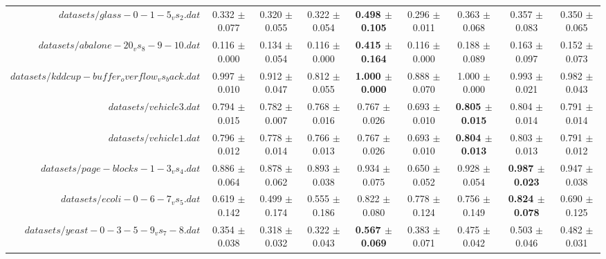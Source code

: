 \begin{table}[!ht]
{\begin{tabular}{r c c c c c c c c}
$datasets/glass-0-1-5_vs_2.dat$ & 0.332 $\pm$ 0.077 & 0.320 $\pm$ 0.055 & 0.322 $\pm$ 0.054 & \textbf{0.498 $\pm$ 0.105} & 0.296 $\pm$ 0.011 & 0.363 $\pm$ 0.068 & 0.357 $\pm$ 0.083 & 0.350 $\pm$ 0.065 \\
$datasets/abalone-20_vs_8-9-10.dat$ & 0.116 $\pm$ 0.000 & 0.134 $\pm$ 0.054 & 0.116 $\pm$ 0.000 & \textbf{0.415 $\pm$ 0.164} & 0.116 $\pm$ 0.000 & 0.188 $\pm$ 0.089 & 0.163 $\pm$ 0.097 & 0.152 $\pm$ 0.073 \\
$datasets/kddcup-buffer_overflow_vs_back.dat$ & 0.997 $\pm$ 0.010 & 0.912 $\pm$ 0.047 & 0.812 $\pm$ 0.055 & \textbf{1.000 $\pm$ 0.000} & 0.888 $\pm$ 0.070 & 1.000 $\pm$ 0.000 & 0.993 $\pm$ 0.021 & 0.982 $\pm$ 0.043 \\
$datasets/vehicle3.dat$ & 0.794 $\pm$ 0.015 & 0.782 $\pm$ 0.007 & 0.768 $\pm$ 0.016 & 0.767 $\pm$ 0.026 & 0.693 $\pm$ 0.010 & \textbf{0.805 $\pm$ 0.015} & 0.804 $\pm$ 0.014 & 0.791 $\pm$ 0.014 \\
$datasets/vehicle1.dat$ & 0.796 $\pm$ 0.012 & 0.778 $\pm$ 0.014 & 0.766 $\pm$ 0.013 & 0.767 $\pm$ 0.026 & 0.693 $\pm$ 0.010 & \textbf{0.804 $\pm$ 0.013} & 0.803 $\pm$ 0.013 & 0.791 $\pm$ 0.012 \\
$datasets/page-blocks-1-3_vs_4.dat$ & 0.886 $\pm$ 0.064 & 0.878 $\pm$ 0.062 & 0.893 $\pm$ 0.038 & 0.934 $\pm$ 0.075 & 0.650 $\pm$ 0.052 & 0.928 $\pm$ 0.054 & \textbf{0.987 $\pm$ 0.023} & 0.947 $\pm$ 0.038 \\
$datasets/ecoli-0-6-7_vs_5.dat$ & 0.619 $\pm$ 0.142 & 0.499 $\pm$ 0.174 & 0.555 $\pm$ 0.186 & 0.822 $\pm$ 0.080 & 0.778 $\pm$ 0.124 & 0.756 $\pm$ 0.149 & \textbf{0.824 $\pm$ 0.078} & 0.690 $\pm$ 0.125 \\
$datasets/yeast-0-3-5-9_vs_7-8.dat$ & 0.354 $\pm$ 0.038 & 0.318 $\pm$ 0.032 & 0.322 $\pm$ 0.043 & \textbf{0.567 $\pm$ 0.069} & 0.383 $\pm$ 0.071 & 0.475 $\pm$ 0.042 & 0.503 $\pm$ 0.046 & 0.482 $\pm$ 0.031 \\
\end{tabular}}
\end{table}
